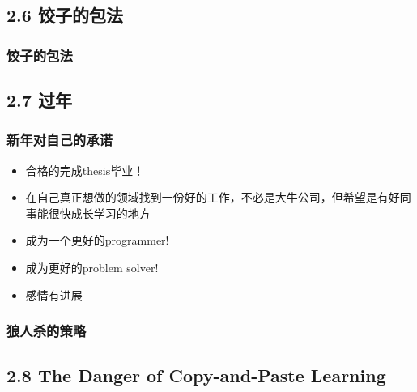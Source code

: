 \documentclass[11pt]{article}
\begin{document}
\subsection*{2.6 饺子的包法}
\label{sec:orgheadline78}

\subsubsection*{饺子的包法}
\label{sec:orgheadline77}

\subsection*{2.7 过年}
\label{sec:orgheadline86}

\subsubsection*{新年对自己的承诺}
\label{sec:orgheadline84}

\begin{itemize}
\item 合格的完成thesis毕业！
\label{sec:orgheadline79}

\item 在自己真正想做的领域找到一份好的工作，不必是大牛公司，但希望是有好同事能很快成长学习的地方
\label{sec:orgheadline80}

\item 成为一个更好的programmer!
\label{sec:orgheadline81}

\item 成为更好的problem solver!
\label{sec:orgheadline82}
\item 感情有进展
\label{sec:orgheadline83}
\end{itemize}
\subsubsection*{狼人杀的策略}
\label{sec:orgheadline85}
\subsection*{2.8 The Danger of Copy-and-Paste Learning}
\label{sec:orgheadline100}
\end{document}
